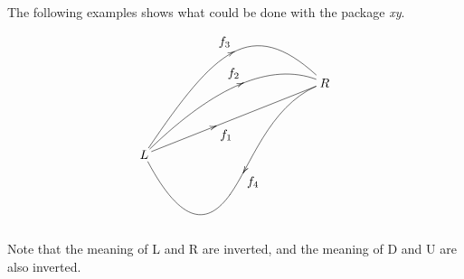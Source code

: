 The following examples shows what could be done with the package {\em xy}.
\[
\begin{xy}
(0,0)*[o]+{L};(50,20)*[o]+{R}=        %
"R"**\crv{} ? (0.4)*@{>}*^+!UL{f_1},     %
"R"**\crv{(30,30)} ? *@{>}*^+!DR{f_2},   %
"R"**\crv{(20,30)&(30,40)} ? *@{>}*^+!DR{f_3},      %
"R"**\crv{(10,-20)&(25,-20)&(35,15)} ? (0.6)*@{<}*^+!UL{f_4}   %
\end{xy}
\]

Note that the meaning of L and R are inverted, and the meaning of D and U
are also inverted.

